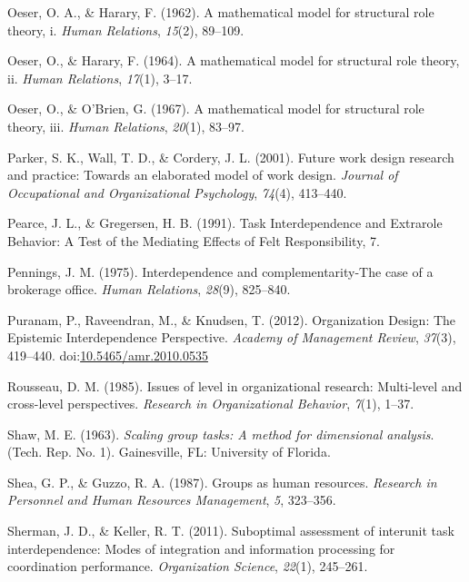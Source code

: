 \documentclass[english,,man]{apa6}
\theoremstyle{definition}
\theoremstyle{definition}
\theoremstyle{definition}
\theoremstyle{remark}
\begin{document}
\leavevmode\hypertarget{ref-oeser1962mathematical}{}%
Oeser, O. A., \& Harary, F. (1962). A mathematical model for structural
role theory, i. \emph{Human Relations}, \emph{15}(2), 89--109.

\leavevmode\hypertarget{ref-oeser1964mathematical}{}%
Oeser, O., \& Harary, F. (1964). A mathematical model for structural
role theory, ii. \emph{Human Relations}, \emph{17}(1), 3--17.

\leavevmode\hypertarget{ref-oeser1967mathematical}{}%
Oeser, O., \& O'Brien, G. (1967). A mathematical model for structural
role theory, iii. \emph{Human Relations}, \emph{20}(1), 83--97.

\leavevmode\hypertarget{ref-parker_future_2001}{}%
Parker, S. K., Wall, T. D., \& Cordery, J. L. (2001). Future work design
research and practice: Towards an elaborated model of work design.
\emph{Journal of Occupational and Organizational Psychology},
\emph{74}(4), 413--440.

\leavevmode\hypertarget{ref-pearce_task_nodate}{}%
Pearce, J. L., \& Gregersen, H. B. (1991). Task Interdependence and
Extrarole Behavior: A Test of the Mediating Effects of Felt
Responsibility, 7.

\leavevmode\hypertarget{ref-pennings_interdependence_1975}{}%
Pennings, J. M. (1975). Interdependence and complementarity-The case of
a brokerage office. \emph{Human Relations}, \emph{28}(9), 825--840.

\leavevmode\hypertarget{ref-puranam_organization_2012}{}%
Puranam, P., Raveendran, M., \& Knudsen, T. (2012). Organization Design:
The Epistemic Interdependence Perspective. \emph{Academy of Management
Review}, \emph{37}(3), 419--440.
doi:\href{https://doi.org/10.5465/amr.2010.0535}{10.5465/amr.2010.0535}

\leavevmode\hypertarget{ref-rousseau1985issues}{}%
Rousseau, D. M. (1985). Issues of level in organizational research:
Multi-level and cross-level perspectives. \emph{Research in
Organizational Behavior}, \emph{7}(1), 1--37.

\leavevmode\hypertarget{ref-shawscaling}{}%
Shaw, M. E. (1963). \emph{Scaling group tasks: A method for dimensional
analysis}. (Tech. Rep. No. 1). Gainesville, FL: University of Florida.

\leavevmode\hypertarget{ref-shea1987groups}{}%
Shea, G. P., \& Guzzo, R. A. (1987). Groups as human resources.
\emph{Research in Personnel and Human Resources Management}, \emph{5},
323--356.

\leavevmode\hypertarget{ref-sherman_suboptimal_2011-1}{}%
Sherman, J. D., \& Keller, R. T. (2011). Suboptimal assessment of
interunit task interdependence: Modes of integration and information
processing for coordination performance. \emph{Organization Science},
\emph{22}(1), 245--261.
\end{document}
